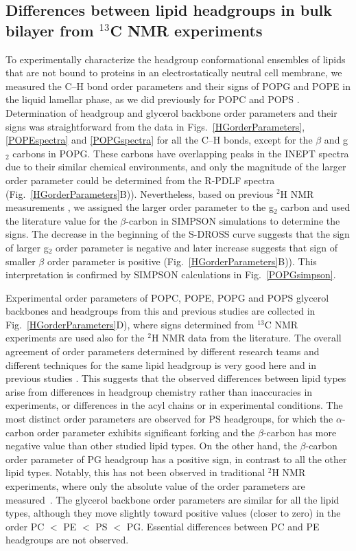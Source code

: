 \documentclass[aps,prl,superscriptaddress,twocolumn]{revtex4}
\begin{document}
\subsection{Differences between lipid headgroups in bulk bilayer from $^{13}$C NMR experiments}

To experimentally characterize the headgroup conformational ensembles of lipids that are not bound to proteins in an electrostatically neutral cell membrane, we measured the C--H bond order parameters and their signs of POPG and POPE in the liquid lamellar phase, as we did previously for POPC and POPS \cite{ferreira13,ferreira16,antila19}.
Determination of headgroup and glycerol backbone order parameters and their signs
was straightforward from the data in Figs.~\ref{HGorderParameters}, \ref{POPEspectra} and \ref{POPGspectra}
for all the C--H bonds, except for the $\beta$ and g$_2$ carbons in POPG.
These carbons have overlapping peaks in the INEPT spectra due to their similar chemical environments,
and only the magnitude of the larger order parameter could be determined from the R-PDLF spectra (Fig.~\ref{HGorderParameters}B)).
Nevertheless, based on previous $^2$H NMR measurements \cite{wohlgemuth80,gally81,borle85},
we assigned the larger order parameter to the g$_2$ carbon
and used the literature value for the $\beta$-carbon in SIMPSON simulations to determine the signs.
The decrease in the beginning of the S-DROSS curve suggests that the sign of larger g$_2$ order parameter
is negative and later increase suggests that sign of smaller $\beta$ order parameter is positive (Fig.~\ref{HGorderParameters}B)).
This interpretation is confirmed by SIMPSON calculations in Fig.~\ref{POPGsimpson}.

Experimental order parameters of POPC, POPE, POPG and POPS glycerol backbones and headgroups from this and previous studies are collected in Fig.~\ref{HGorderParameters}D), where signs determined from $^{13}$C NMR experiments are used also for the $^2$H NMR data from the literature. The overall agreement of order parameters determined by different research teams and different techniques for the same lipid headgroup is very good here and in previous studies \cite{botan15,ollila16,antila19}. This suggests that the observed differences between lipid types arise from differences in headgroup chemistry rather than inaccuracies in experiments, or differences in the acyl chains or in experimental conditions. The most distinct order parameters are observed for PS headgroups, for which the $\alpha$-carbon order parameter exhibits significant forking and the $\beta$-carbon has more negative value than other studied lipid types. On the other hand, the $\beta$-carbon order parameter of PG headgroup has a positive sign, in contrast to all the other lipid types. Notably, this has not been observed in traditional $^2$H NMR experiments, where only the absolute value of the order parameters are measured~\cite{wohlgemuth80,gally81,borle85}. The glycerol backbone order parameters are similar for all the lipid types, although they move slightly toward positive values (closer to zero) in the order PC $<$ PE $<$ PS $<$ PG. Essential differences between PC and PE headgroups are not observed.
\end{document}
